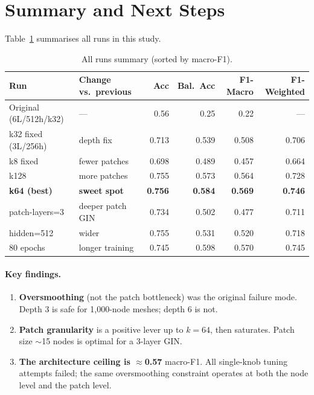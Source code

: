 \documentclass[11pt,a4paper]{article}
\begin{document}
\section{Summary and Next Steps}

Table~\ref{tab:summary} summarises all runs in this study.

\begin{table}[h]
  \centering
  \caption{All runs summary (sorted by macro-F1).}
  \smallskip
  \begin{tabular}{llrrrr}
    \toprule
    Run & Change vs.\ previous & Acc & Bal.\ Acc & F1-Macro & F1-Weighted \\
    \midrule
    Original (6L/512h/k32) & --- & 0.56 & 0.25 & 0.22 & --- \\
    \midrule
    k32 fixed (3L/256h)    & depth fix          & 0.713 & 0.539 & 0.508 & 0.706 \\
    k8  fixed              & fewer patches      & 0.698 & 0.489 & 0.457 & 0.664 \\
    k128                   & more patches       & 0.755 & 0.573 & 0.564 & 0.728 \\
    \textbf{k64 (best)}    & \textbf{sweet spot}& \textbf{0.756} & \textbf{0.584} & \textbf{0.569} & \textbf{0.746} \\
    \midrule
    patch-layers=3         & deeper patch GIN   & 0.734 & 0.502 & 0.477 & 0.711 \\
    hidden=512             & wider              & 0.755 & 0.531 & 0.520 & 0.718 \\
    80 epochs              & longer training    & 0.745 & 0.598 & 0.570 & 0.745 \\
    \bottomrule
  \end{tabular}
  \label{tab:summary}
\end{table}

\paragraph{Key findings.}
\begin{enumerate}
  \item \textbf{Oversmoothing} (not the patch bottleneck) was the original
        failure mode.  Depth 3 is safe for 1{,}000-node meshes; depth 6 is not.
  \item \textbf{Patch granularity} is a positive lever up to $k{=}64$, then
        saturates.  Patch size $\sim$15 nodes is optimal for a 3-layer GIN.
  \item \textbf{The architecture ceiling is $\approx$0.57} macro-F1. All
        single-knob tuning attempts failed; the same oversmoothing constraint
        operates at both the node level and the patch level.
\end{enumerate}
\end{document}
